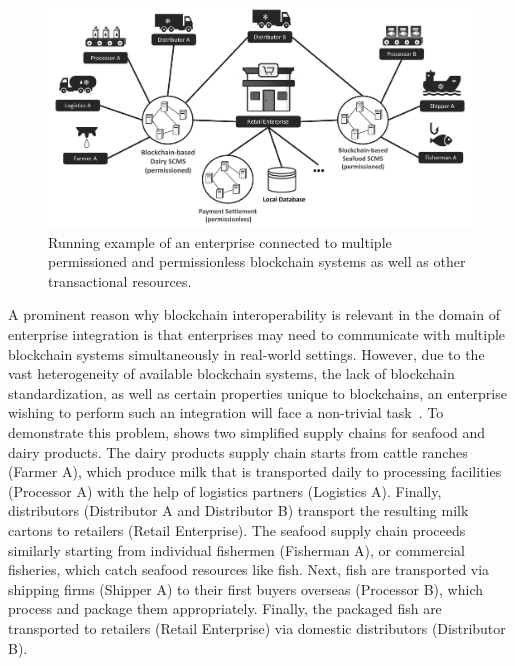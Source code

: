 \documentclass[review]{elsarticle}
\begin{document}
\begin{figure}
	\includegraphics[width=\linewidth]{graphics/scenario}
	\caption[Running example]{Running example of an enterprise connected to multiple permissioned and permissionless blockchain systems as well as other transactional resources.}
	\label{fig:scenario}
\end{figure}

A prominent reason why blockchain interoperability is relevant in the domain of enterprise integration is that enterprises may need to communicate with multiple blockchain systems simultaneously in real-world settings.
However, due to the vast heterogeneity of available blockchain systems, the lack of blockchain standardization, as well as certain properties unique to blockchains, an enterprise wishing to perform such an integration will face a non-trivial task~\cite{Falazi2020_UnifiedIntegrationBlockchains}.
To demonstrate this problem,  shows two simplified supply chains for seafood and dairy products.
The dairy products supply chain starts from cattle ranches (Farmer A), which produce milk that is transported daily to processing facilities (Processor A) with the help of logistics partners (Logistics A).
Finally, distributors (Distributor A and Distributor B) transport the resulting milk cartons to retailers (Retail Enterprise).
The seafood supply chain proceeds similarly starting from individual fishermen (Fisherman A), or commercial fisheries, which catch seafood resources like fish.
Next, fish are transported via shipping firms (Shipper A) to their first buyers overseas (Processor B), which process and package them appropriately.
Finally, the packaged fish are transported to retailers (Retail Enterprise) via domestic distributors (Distributor B).
\end{document}
